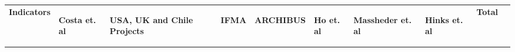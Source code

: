 \begin{table}%
	\vspace{-1,5cm}
	\begin{adjustwidth}{2cm}{0cm}
	\resizebox{8cm}{!} {
	\begin{tabular}{p{6cm}llllllp{1cm}lr}
		\hline
		 {\bf Indicators} &  \begin{sideways}{\bf Costa et. al \cite{Costa2004}}\end{sideways} & \begin{sideways}{\bf USA, UK and Chile Projects \cite{Costa2004}}\end{sideways} & \begin{sideways}{\bf IFMA \cite{Roka-Madarasz2010}}\end{sideways} & \begin{sideways}{\bf ARCHIBUS}\end{sideways} & \begin{sideways}{\bf Ho et. al \cite{Ho2000}}\end{sideways} & \begin{sideways}{\bf Massheder et. al \cite{Mass1998}}\end{sideways} & \begin{sideways}{\bf Hinks et. al \cite{Hinks1999}}\end{sideways} & {\bf Total} \\ 


\end{tabular}}
\end{adjustwidth}
\end{table}
